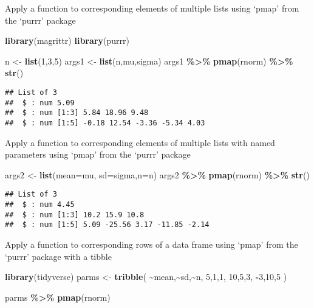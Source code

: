 \documentclass[
]{article}
\newenvironment{Shaded}{\begin{snugshade}}{\end{snugshade}}
\newcommand{\AttributeTok}[1]{\textcolor[rgb]{0.13,0.29,0.53}{#1}}
\newcommand{\DecValTok}[1]{\textcolor[rgb]{0.00,0.00,0.81}{#1}}
\newcommand{\FunctionTok}[1]{\textcolor[rgb]{0.13,0.29,0.53}{\textbf{#1}}}
\newcommand{\NormalTok}[1]{#1}
\newcommand{\OtherTok}[1]{\textcolor[rgb]{0.56,0.35,0.01}{#1}}
\newcommand{\SpecialCharTok}[1]{\textcolor[rgb]{0.81,0.36,0.00}{\textbf{#1}}}
\begin{document}
Apply a function to corresponding elements of multiple lists using
`pmap' from the `purrr' package

\begin{Shaded}
\begin{Highlighting}[]
\FunctionTok{library}\NormalTok{(magrittr)}
\FunctionTok{library}\NormalTok{(purrr)}

\NormalTok{n }\OtherTok{\textless{}{-}} \FunctionTok{list}\NormalTok{(}\DecValTok{1}\NormalTok{,}\DecValTok{3}\NormalTok{,}\DecValTok{5}\NormalTok{)}
\NormalTok{args1 }\OtherTok{\textless{}{-}} \FunctionTok{list}\NormalTok{(n,mu,sigma)}
\NormalTok{args1 }\SpecialCharTok{\%\textgreater{}\%} 
  \FunctionTok{pmap}\NormalTok{(rnorm) }\SpecialCharTok{\%\textgreater{}\%} 
  \FunctionTok{str}\NormalTok{()}
\end{Highlighting}
\end{Shaded}

\begin{verbatim}
## List of 3
##  $ : num 5.09
##  $ : num [1:3] 5.84 18.96 9.48
##  $ : num [1:5] -0.18 12.54 -3.36 -5.34 4.03
\end{verbatim}

Apply a function to corresponding elements of multiple lists with named
parameters using `pmap' from the `purrr' package

\begin{Shaded}
\begin{Highlighting}[]
\NormalTok{args2 }\OtherTok{\textless{}{-}} \FunctionTok{list}\NormalTok{(}\AttributeTok{mean=}\NormalTok{mu, }\AttributeTok{sd=}\NormalTok{sigma,}\AttributeTok{n=}\NormalTok{n)}
\NormalTok{args2 }\SpecialCharTok{\%\textgreater{}\%} 
  \FunctionTok{pmap}\NormalTok{(rnorm) }\SpecialCharTok{\%\textgreater{}\%} 
  \FunctionTok{str}\NormalTok{()}
\end{Highlighting}
\end{Shaded}

\begin{verbatim}
## List of 3
##  $ : num 4.45
##  $ : num [1:3] 10.2 15.9 10.8
##  $ : num [1:5] 5.09 -25.56 3.17 -11.85 -2.14
\end{verbatim}

Apply a function to corresponding rows of a data frame using `pmap' from
the `purrr' package with a tibble

\begin{Shaded}
\begin{Highlighting}[]
\FunctionTok{library}\NormalTok{(tidyverse)}
\NormalTok{parms }\OtherTok{\textless{}{-}} \FunctionTok{tribble}\NormalTok{(}
  \SpecialCharTok{\textasciitilde{}}\NormalTok{mean,}\SpecialCharTok{\textasciitilde{}}\NormalTok{sd,}\SpecialCharTok{\textasciitilde{}}\NormalTok{n,}
  \DecValTok{5}\NormalTok{,}\DecValTok{1}\NormalTok{,}\DecValTok{1}\NormalTok{,}
  \DecValTok{10}\NormalTok{,}\DecValTok{5}\NormalTok{,}\DecValTok{3}\NormalTok{,}
  \SpecialCharTok{{-}}\DecValTok{3}\NormalTok{,}\DecValTok{10}\NormalTok{,}\DecValTok{5}
\NormalTok{)}

\NormalTok{parms }\SpecialCharTok{\%\textgreater{}\%} 
  \FunctionTok{pmap}\NormalTok{(rnorm)}
\end{Highlighting}
\end{Shaded}
\end{document}
